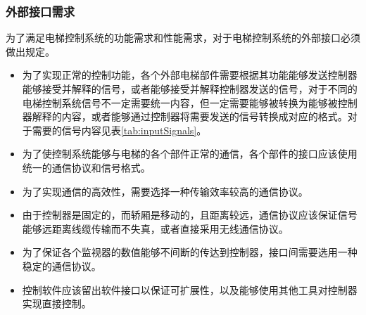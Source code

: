 \subsubsection{外部接口需求}
为了满足电梯控制系统的功能需求和性能需求，对于电梯控制系统的外部接口必须做出规定。
\begin{itemize}
	\item 为了实现正常的控制功能，各个外部电梯部件需要根据其功能能够发送控制器能够接受并解释的信号，或者能够接受并解释控制器发送的信号，对于不同的电梯控制系统信号不一定需要统一内容，但一定需要能够被转换为能够被控制器解释的内容，或者能够通过控制器将需要发送的信号转换成对应的格式。对于需要的信号内容见表\ref{tab:inputSignals}。
	\item 为了使控制系统能够与电梯的各个部件正常的通信，各个部件的接口应该使用统一的通信协议和信号格式。
	\item 为了实现通信的高效性，需要选择一种传输效率较高的通信协议。
	\item 由于控制器是固定的，而轿厢是移动的，且距离较远，通信协议应该保证信号能够远距离线缆传输而不失真，或者直接采用无线通信协议。
	\item 为了保证各个监视器的数值能够不间断的传达到控制器，接口间需要选用一种稳定的通信协议。
	\item 控制软件应该留出软件接口以保证可扩展性，以及能够使用其他工具对控制器实现直接控制。
\end{itemize}

